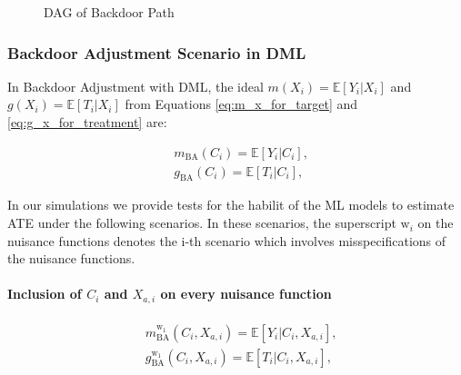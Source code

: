 \documentclass{article}
\numberwithin{equation}{section}
\begin{document}
\begin{figure}[H]
    \centering
    \caption{DAG of Backdoor Path}
    \label{fig:dag_backdoor_path}
\end{figure}

\subsubsection{Backdoor Adjustment Scenario in DML}

In Backdoor Adjustment with DML, the ideal $m(X_i) = \mathbb{E}[Y_i | X_i]$ and $g(X_i) = \mathbb{E}[T_i | X_i]$ from Equations \eqref{eq:m_x_for_target} and \eqref{eq:g_x_for_treatment} are:

\begin{align}
    & m_{\text{BA}}(C_i) = \mathbb{E}[Y_i | C_i],
    \label{eq:m_x_for_target_backdoor_adjustment}
    \\
    & g_{\text{BA}}(C_i) = \mathbb{E}[T_i | C_i],
    \label{eq:g_x_for_treatment_backdoor_adjustment}
\end{align}

In our simulations we provide tests for the habilit of the ML models to estimate ATE under the following scenarios. In these scenarios, the superscript $\text{w}_i$ on the nuisance functions denotes the i-th scenario which involves misspecifications of the nuisance functions.

\paragraph{Inclusion of $C_i$ and $X_{a, i}$ on every nuisance function}

\begin{align}
    & m_{\text{BA}}^{\text{w}_1}(C_i, X_{a, i}) = \mathbb{E}[Y_i | C_i, X_{a, i}],
    \label{eq:m_x_for_target_backdoor_adjustment_wrong_1}
    \\
    & g_{\text{BA}}^{\text{w}_1}(C_i, X_{a, i}) = \mathbb{E}[T_i | C_i, X_{a, i}],
    \label{eq:g_x_for_treatment_backdoor_adjustment_wrong_1}
\end{align}
\end{document}
